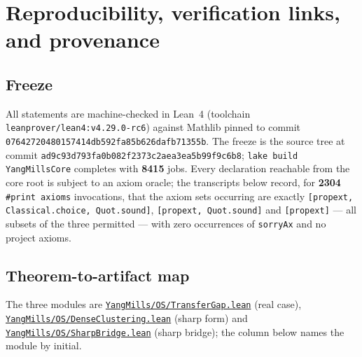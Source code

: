 \documentclass[11pt]{article}
\theoremstyle{definition}
\newcommand{\lean}[1]{\texttt{#1}}
\newcommand{\anchor}{ad9c93d793fa0b082f2373c2aea3ea5b99f9c6b8}
\newcommand{\osfile}[2]{%
  \href{https://github.com/lluiseriksson/THE-ERIKSSON-PROGRAMME/blob/\anchor/YangMills/OS/#1.lean}{\nolinkurl{#2}}}
\begin{document}
\section{Reproducibility, verification links, and provenance}
\label{sec:prov}

\subsection*{Freeze}

All statements are machine-checked in Lean~4 (toolchain
\lean{leanprover/lean4:v4.29.0-rc6}) against Mathlib pinned to commit
\lean{0764272048\-0157414db592fa85b626dafb71355b}.  The freeze is the
source tree at commit
\lean{\anchor}; \lean{lake build YangMillsCore} completes with
\textbf{8415} jobs.  Every declaration reachable from the core root is
subject to an axiom oracle; the transcripts below record, for
\textbf{2304} \lean{\#print axioms} invocations, that the axiom sets
occurring are exactly \lean{[propext, Classical.choice, Quot.sound]},
\lean{[propext, Quot.sound]} and \lean{[propext]} --- all subsets of the
three permitted --- with zero occurrences of \lean{sorryAx} and no
project axioms.

\subsection*{Theorem-to-artifact map}

The three modules are
\osfile{TransferGap}{YangMills/OS/TransferGap.lean} (real case),
\osfile{DenseClustering}{YangMills/OS/DenseClustering.lean} (sharp form)
and \osfile{SharpBridge}{YangMills/OS/SharpBridge.lean} (sharp bridge);
the column below names the module by initial.
\end{document}
